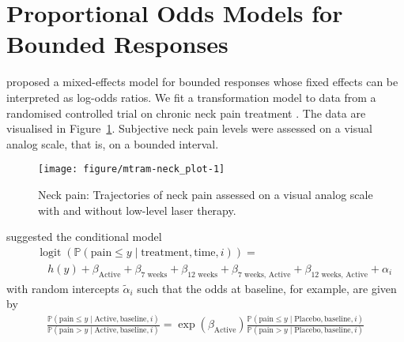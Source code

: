 \documentclass[article,nojss,shortnames]{jss}\usepackage[]{graphicx}\usepackage[]{xcolor}
\newcommand{\ry}{y}
\newcommand{\h}{h}
\newcommand{\eshiftparm}{\beta}
\renewcommand{\Prob}{\mathbb{P}}
\DeclareMathOperator{\logit}{logit}
\begin{document}
\section{Proportional Odds Models for Bounded Responses} \label{sec:logit}

\cite{manuguerra_heller_2010} proposed a mixed-effects model for bounded
responses  whose fixed effects can be interpreted as log-odds ratios. 
We fit a transformation model to data from
a randomised controlled trial on chronic neck pain treatment
\citep{chow_heller_2006}. The data are visualised in
Figure~\ref{fig:neck_pain}. Subjective neck pain levels were assessed on a 
visual analog scale, that is, on a bounded interval.

\begin{figure}[t]
\begin{Schunk}


{\centering \texttt{[image: figure/mtram-neck\_plot-1]} 

}

\end{Schunk}
\caption{Neck pain: Trajectories of neck pain assessed on a visual analog
         scale with and without low-level laser therapy.
         \label{fig:neck_pain}}
\end{figure}

\cite{manuguerra_heller_2010} suggested the conditional model
\begin{eqnarray*}
& & \logit(\Prob(\text{pain} \le \ry \mid \text{treatment}, \text{time}, i)) =
\\
& &  \quad \h(\ry) + \eshiftparm_\text{Active} + \eshiftparm_\text{7 weeks} + 
  \eshiftparm_\text{12 weeks} + \eshiftparm_\text{7 weeks, Active} + 
  \eshiftparm_\text{12 weeks, Active} + \alpha_i
\end{eqnarray*}
with random intercepts $\tilde{\alpha}_i$ such that the odds at baseline, for example, are given by
\begin{eqnarray*}
\frac{\Prob(\text{pain} \le \ry \mid \text{Active}, \text{baseline}, i)}
     {\Prob(\text{pain} > \ry \mid \text{Active}, \text{baseline}, i)} = 
\exp(\eshiftparm_\text{Active}) 
\frac{\Prob(\text{pain} \le \ry \mid \text{Placebo}, \text{baseline}, i)}
     {\Prob(\text{pain} > \ry \mid \text{Placebo}, \text{baseline}, i)}
\end{eqnarray*}
\end{document}
